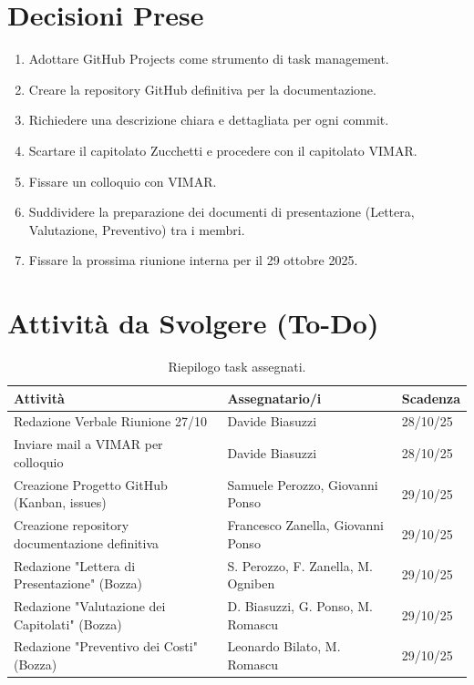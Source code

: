 \documentclass[a4paper, 11pt, oneside]{scrartcl} %
\begin{document}
\newpage
\section{Decisioni Prese}

\begin{enumerate}
    \item Adottare GitHub Projects come strumento di task management.
    \item Creare la repository GitHub definitiva per la documentazione.
    \item Richiedere una descrizione chiara e dettagliata per ogni commit.
    \item Scartare il capitolato Zucchetti e procedere con il capitolato VIMAR.
    \item Fissare un colloquio con VIMAR.
    \item Suddividere la preparazione dei documenti di presentazione (Lettera, Valutazione, Preventivo) tra i membri.
    \item Fissare la prossima riunione interna per il 29 ottobre 2025.
\end{enumerate}

\newpage
\section{Attività da Svolgere (To-Do)}

\begin{table}[h!]
\centering
\begin{tabular}{@{}lll@{}}
\toprule
\textbf{Attività} & \textbf{Assegnatario/i} & \textbf{Scadenza} \\
\midrule
Redazione Verbale Riunione 27/10 & Davide Biasuzzi & 28/10/25 \\
Inviare mail a VIMAR per colloquio & Davide Biasuzzi & 28/10/25 \\
Creazione Progetto GitHub (Kanban, issues) & Samuele Perozzo, Giovanni Ponso & 29/10/25 \\
Creazione repository documentazione definitiva & Francesco Zanella, Giovanni Ponso & 29/10/25 \\
Redazione "Lettera di Presentazione" (Bozza) & S. Perozzo, F. Zanella, M. Ogniben & 29/10/25 \\
Redazione "Valutazione dei Capitolati" (Bozza) & D. Biasuzzi, G. Ponso, M. Romascu & 29/10/25 \\
Redazione "Preventivo dei Costi" (Bozza) & Leonardo Bilato, M. Romascu & 29/10/25 \\
\bottomrule
\end{tabular}
\caption{Riepilogo task assegnati.}
\end{table}
\end{document}
